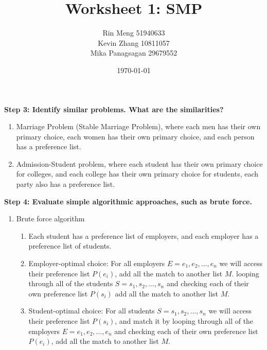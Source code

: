 \documentclass[12pt]{article}
\title{Worksheet 1: SMP}
\author{Rin Meng 51940633\\ Kevin Zhang 10811057\\ Mika Panagsagan 29679552}
\date{\today}
\begin{document}
\maketitle

\textbf{Step 3: Identify similar problems. What are the similarities?}
   \begin{enumerate}
    \item Marriage Problem (Stable Marriage Problem), where each men has their own primary choice,
    each women has their own primary choice, and each person has a preference list.
    \item Admission-Student problem, where each student has their own primary choice for colleges,
    and each college has their own primary choice for students, each party also has a preference list.
   \end{enumerate}

\textbf{Step 4: Evaluate simple algorithmic approaches, such as brute force.}
   \begin{enumerate}
    \item Brute force algorithm
        \begin{enumerate}
            \item Each student has a preference list of employers, 
            and each employer has a preference list of students.
            \item Employer-optimal choice: For all employers $E = {e_1, e_2, \ldots, e_n}$ we will access their
            preference list $P(e_i)$, add all the match to another list $M$.
            looping through all of the students $S = {s_1, s_2, \ldots, s_n}$ and checking each of their own
            preference list $P(s_i)$ add all the match to another list $M$.
            \item Student-optimal choice: For all students $S = {s_1, s_2, \ldots, s_n}$ we will access their
            preference list $P(s_i)$, and match it by
            looping through all of the employers $E = {e_1, e_2, \ldots, e_n}$ and checking each of their own
            preference list $P(e_i)$, add all the match to another list $M$.
        \end{enumerate}
    
   \end{enumerate}
\end{document}
